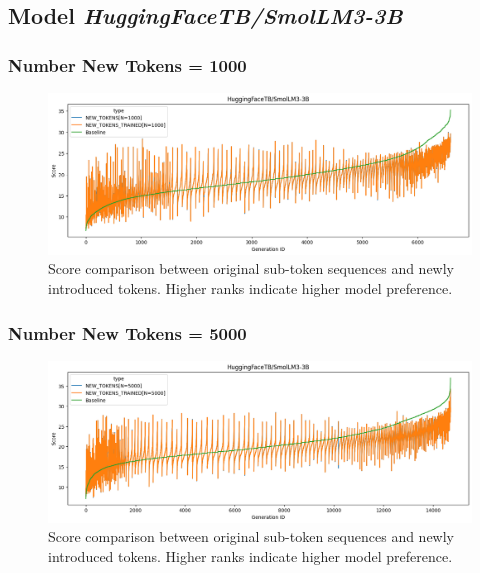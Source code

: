 \subsection{Model \textit{HuggingFaceTB/SmolLM3-3B}}

\subsubsection{Number New Tokens = 1000}
\begin{figure}[H]
    \centering
    \includegraphics[width=\textwidth]{Figures/Appendix/token-rank-comparison_1000_smol3B.png}
    \caption[Score comparison for \textit{SmolLM3-3B} w/ 1000 new tokens]{Score comparison between original sub-token sequences and newly introduced tokens. Higher ranks indicate higher model preference.}
    \label{annex:fig:new_token_rank:1000_smol3B}
\end{figure}
\FloatBarrier

\subsubsection{Number New Tokens = 5000}
\begin{figure}[H]
    \centering
    \includegraphics[width=\textwidth]{Figures/Appendix/token-rank-comparison_5000_smol3B.png}
    \caption[Score comparison for \textit{SmolLM3-3B} w/ 5000 new tokens]{Score comparison between original sub-token sequences and newly introduced tokens. Higher ranks indicate higher model preference.}
    \label{annex:fig:new_token_rank:5000_smol3B}
\end{figure}
\FloatBarrier

